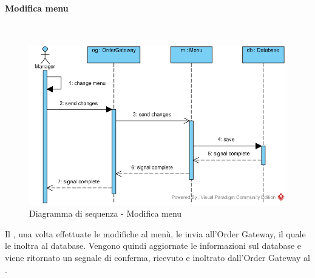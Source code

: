 \begin{samepage}
\paragraph{Modifica menu}\mbox{}\\
\end{samepage}
\begin{figure}[H]
	\centering
	\includegraphics[width=15cm]{../../documenti/SpecificaTecnica/diagrammi/sequenza/direttore_modifica_menu.png}
	\caption{Diagramma di sequenza - Modifica menu}
\end{figure}
Il \Manager{}, una volta effettuate le modifiche al menù, le invia all'Order Gateway, il quale le inoltra al database. Vengono quindi aggiornate le informazioni sul database e viene ritornato un segnale di conferma, ricevuto e inoltrato dall'Order Gateway al \Manager{}.


